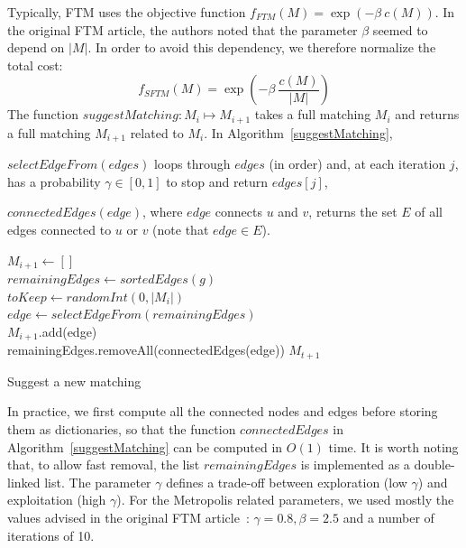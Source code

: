 Typically, FTM uses the objective function $f_{FTM}(M) = \exp(-\beta\ c(M))$.
In the original FTM article, the authors noted that the parameter $\beta$ seemed to depend on $|M|$.
In order to avoid this dependency, we therefore normalize the total cost:
\begin{equation}
	f_{SFTM}(M) = \exp(-\beta\ \frac{c(M)}{|M|})
\end{equation}
The function $suggestMatching: M_i \mapsto M_{i+1}$ takes a full matching $M_i$ and returns a full matching $M_{i+1}$ related to $M_i$.
In Algorithm~\ref{suggestMatching}, 
\begin{compactenum}
	\item $selectEdgeFrom(edges)$ loops through $edges$ (in order) and, at each iteration $j$, has a probability $\gamma \in [0,1]$ to stop and return $edges[j]$,
    \item $connectedEdges(edge)$, where $edge$ connects $u$ and $v$, returns the set $E$ of all edges connected to $u$ or $v$ (note that $edge \in E$).
\end{compactenum}

\begin{algorithm}
\SetAlgoLined
{}
 $M_{i+1} \gets []$  \\
 $remainingEdges \gets sortedEdges(g)$ \\
 $toKeep \gets randomInt(0, |M_i|)$ \\
  {
    $edge \gets selectEdgeFrom(remainingEdges)$ \\
    $M_{i+1}$.add(edge)\\
    remainingEdges.removeAll(connectedEdges(edge))
 }
 \Return $M_{t+1}$
 \caption{Suggest a new matching}\label{suggestMatching}
\end{algorithm}

In practice, we first compute all the connected nodes and edges before storing them as dictionaries, so that the function $connectedEdges$ in Algorithm~\ref{suggestMatching} can be computed in $O(1)$ time.
It is worth noting that, to allow fast removal, the list $remainingEdges$ is implemented as a double-linked list.
The parameter $\gamma$ defines a trade-off between exploration (low $\gamma$) and exploitation (high $\gamma$).
For the Metropolis related parameters, we used mostly the values advised in the original FTM article~\cite{Kumar2011_FTM}: $\gamma = 0.8, \beta = 2.5$ and a number of iterations of 10.

